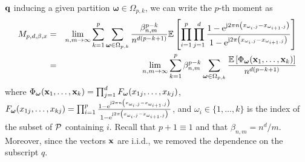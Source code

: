 \documentclass[11pt, draftcls, onecolumn, a4paper]{IEEEtran}
\newcommand{\ee}{{\rm e}}
\newcommand{\jj}{{\rm j}}  \newcommand{\ii}{{\rm i}}  \newcommand{\dd}{{\rm\,d}}
\newcommand{\qv}{{\bf q}}
\newcommand{\xv}{{\bf x}}
\newcommand{\Pc}{{\cal P}}
\newcommand{\omegav}{\boldsymbol{\omega}}
\def\non{\nonumber\\}
\begin{document}
$\qv$ inducing a given partition $\omegav \in \Omega_{p,k}$, we can
write the $p$-th moment as
\begin{eqnarray}
M_{p,d,\beta,x}
&=&  \lim_{n,m \rightarrow \infty}\sum_{k=1}^p\sum_{\omegav \in \Omega_{p,k}} 
     \frac{\beta_{n,m}^{p-k}}{n^{d(p-k+1)}}\EE\left[\prod_{i=1}^p\prod_{j=1}^d
     \frac{1-\ee^{\jj 2 \pi n \left(x_{\omega_i,j}-x_{\omega_{i+1},j}\right)}}{1-\ee^{\jj 2 \pi\left(x_{\omega_i,j}-x_{\omega_{i+1},j}\right)}} \right] \non
&=&  \lim_{n,m \rightarrow \infty}\sum_{k=1}^p\beta_{n,m}^{p-k}\sum_{\omegav \in \Omega_{p,k}} \frac{\EE\left[\Phi_{\omegav} (\xv_1,\ldots,\xv_k) \right]}{n^{d(p-k+1)}}
\label{eq:moment2}
\end{eqnarray}
where $\Phi_{\omegav}(\xv_1,\ldots,\xv_k)
=\prod_{j=1}^dF_{\omegav}(x_{1j},\ldots,x_{kj})$,
$F_{\omegav}(x_{1j},\ldots,x_{kj})= \prod_{i=1}^p\frac{1-\ee^{\jj 2
    \pi n \left(x_{\omega_i,j}-x_{\omega_{i+1},j}\right)}}{1-\ee^{\jj
    2 \pi\left(x_{\omega_i,j}-x_{\omega_{i+1},j}\right)}}$, and
$\omega_i \in \{1, \ldots, k\}$ is the index of the subset of $\Pc$
containing $i$. Recall that $p+1\equiv 1$ and that
$\beta_{n,m}=n^d/m$.  Moreover, since the vectors $\xv$ are i.i.d., we
removed the dependence on the subscript $q$.
\end{document}
